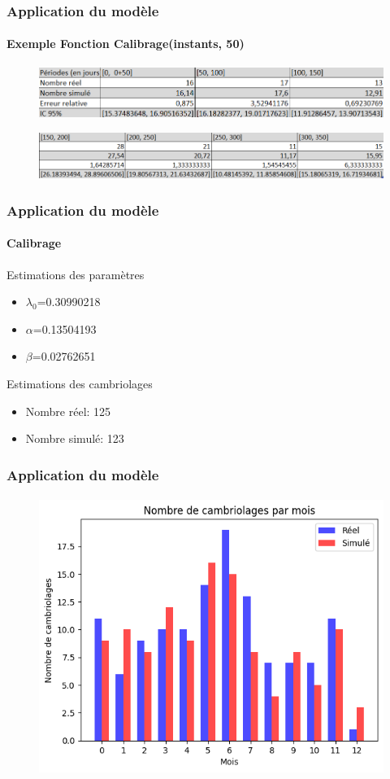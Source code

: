 \begin{frame}
    \frametitle{Application du modèle}
    \framesubtitle{Exemple Fonction Calibrage(instants, 50)}
        \begin{figure}
            \centering
            \includegraphics[width=1.0\linewidth]{figures/tab2.png}
        \end{figure}
        \begin{figure}
            \centering
            \includegraphics[width=1.0\linewidth]{figures/tab3.png}
        \end{figure}
\end{frame}

\begin{frame}
	\frametitle{Application du modèle}
	\framesubtitle{Calibrage}
         \begin{block}{Estimations des paramètres}
         \begin{itemize}
            \item $\lambda_0$=0.30990218
            \item $\alpha$=0.13504193
            \item $\beta$=0.02762651
            \end{itemize}
  
  \end{block}

    \begin{block}{Estimations des cambriolages}
         \begin{itemize}
            \item Nombre réel: 125 
            \item Nombre simulé: 123
            \end{itemize}
  
  \end{block}
\end{frame}

\begin{frame}
    \frametitle{Application du modèle}
    \framesubtitle{}
        \begin{figure}
            \centering
            \includegraphics[width=0.6\linewidth]{figures/téléchargement (1).png}
        \end{figure}
\end{frame}

